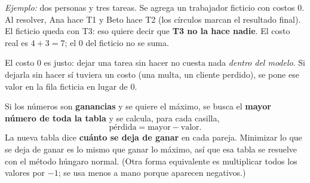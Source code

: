 \documentclass[11pt,a4paper]{article}
\let\pasobase\paso
\renewcommand{\paso}[1]{\needspace{7\baselineskip}\pasobase{#1}}
\newcommand{\rejilla}[3]{%
  \foreach \i in {2,...,#2}{\foreach \j in {2,...,#3}{%
    \draw[gray!55, thin] (#1-\i-\j.north west) rectangle (#1-\i-\j.south east);}}%
  \draw[thick] (#1-2-2.north west) rectangle (#1-#2-#3.south east);}
\newcommand{\sfila}[3]{\begin{pgfonlayer}{background}\fill[gray!16] (#1-#2-2.north west) rectangle (#1-#2-#3.south east);\end{pgfonlayer}}
\newcommand{\cero}[2]{\node[asignado] at (#1-#2) {};}
\begin{document}
\begin{minipage}[c]{0.36\textwidth}
\centering
{}
\end{minipage}\hfill
\begin{minipage}[c]{0.62\textwidth}
\textit{Ejemplo:} dos personas y tres tareas. Se agrega un trabajador ficticio con costos 0. Al resolver,
Ana hace T1 y Beto hace T2 (los círculos marcan el resultado final). El ficticio queda con T3: eso quiere decir
que \textbf{T3 no la hace nadie}. El costo real es $4 + 3 = 7$; el 0 del ficticio no se suma.
\end{minipage}

\medskip
El costo 0 es justo: dejar una tarea sin hacer no cuesta nada \emph{dentro del modelo}. Si dejarla sin hacer sí
tuviera un costo (una multa, un cliente perdido), se pone ese valor en la fila ficticia en lugar de 0.

Si los números son \textbf{ganancias} y se quiere el máximo, se busca el \textbf{mayor número de toda la tabla}
y se calcula, para cada casilla,
\[
\text{pérdida} = \text{mayor} - \text{valor}.
\]
La nueva tabla dice \textbf{cuánto se deja de ganar} en cada pareja. Minimizar lo que se deja de ganar es lo
mismo que ganar lo máximo, así que esa tabla se resuelve con el método húngaro normal. (Otra forma equivalente
es multiplicar todos los valores por $-1$; se usa menos a mano porque aparecen negativos.)
\end{document}
